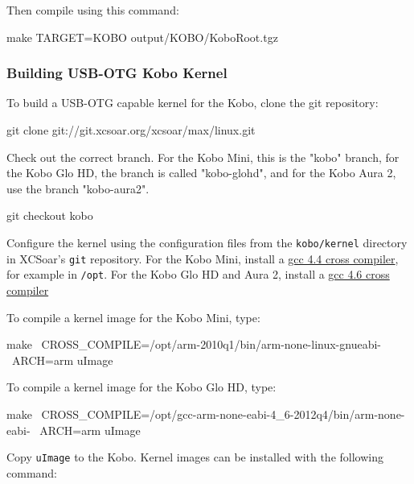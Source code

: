 Then compile using this command:

\begin{verbatim*}
make TARGET=KOBO output/KOBO/KoboRoot.tgz
\end{verbatim*}

\subsubsection{Building USB-OTG Kobo Kernel}

To build a USB-OTG capable kernel for the Kobo, clone the git
repository:

\begin{verbatim*}
git clone git://git.xcsoar.org/xcsoar/max/linux.git
\end{verbatim*}

Check out the correct branch. For the Kobo Mini, this is the "kobo" branch,
for the Kobo Glo HD, the branch is called "kobo-glohd", and for the Kobo Aura 2,
use the branch "kobo-aura2".

\begin{verbatim*}
git checkout kobo
\end{verbatim*}

Configure the kernel using the configuration files from the \texttt{kobo/kernel}
directory in XCSoar's \texttt{git} repository. For the Kobo Mini, install a
\href{http://openlinux.amlogic.com:8000/download/ARM/gnutools/arm-2010q1-202-arm-none-linux-gnueabi-i686-pc-linux-gnu.tar.bz2}{gcc
  4.4 cross compiler}, for example in \texttt{/opt}. For the Kobo Glo HD and
Aura 2, install a
\href{https://launchpad.net/gcc-arm-embedded/4.6/4.6-2012-q4-update/+download/gcc-arm-none-eabi-4_6-2012q4-20121016.tar.bz2}{gcc
  4.6 cross compiler}

To compile a kernel image for the Kobo Mini, type:

\begin{verbatim*}
make \
  CROSS_COMPILE=/opt/arm-2010q1/bin/arm-none-linux-gnueabi- \
  ARCH=arm uImage
\end{verbatim*}

To compile a kernel image for the Kobo Glo HD, type:

\begin{verbatim*}
make \
  CROSS_COMPILE=/opt/gcc-arm-none-eabi-4_6-2012q4/bin/arm-none-eabi- \
  ARCH=arm uImage
\end{verbatim*}

Copy \texttt{uImage} to the Kobo.  Kernel images can be installed with
the following command:

